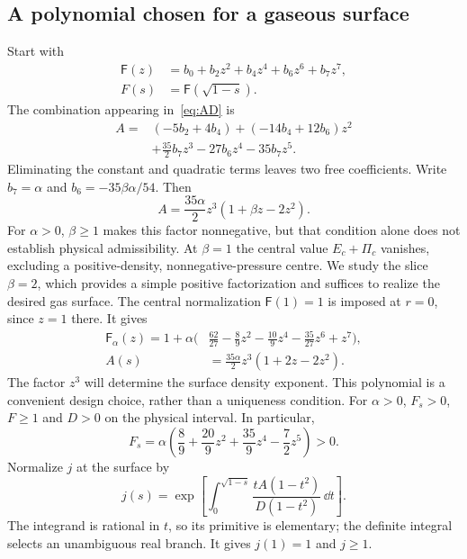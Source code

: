 \subsection{A polynomial chosen for a gaseous surface}
Start with
\begin{align}
 \mathsf F(z)&=b_0+b_2z^2+b_4z^4+b_6z^6+b_7z^7,\nonumber\\
 F(s)&=\mathsf F(\sqrt{1-s}).
\end{align}
The combination appearing in~\eqref{eq:AD} is
\begin{align}
 A={}&(-5b_2+4b_4)+(-14b_4+12b_6)z^2\nonumber\\
 &+\frac{35}{2}b_7z^3-27b_6z^4-35b_7z^5.
\end{align}
Eliminating the constant and quadratic terms leaves two free coefficients. Write $b_7=\alpha$ and $b_6=-35\beta\alpha/54$. Then
\begin{equation}
 A=\frac{35\alpha}{2}z^3(1+\beta z-2z^2).
\end{equation}
For $\alpha>0$, $\beta\ge1$ makes this factor nonnegative, but that condition alone does not establish physical admissibility. At $\beta=1$ the central value $E_c+\Pi_c$ vanishes, excluding a positive-density, nonnegative-pressure centre. We study the slice $\beta=2$, which provides a simple positive factorization and suffices to realize the desired gas surface. The central normalization $\mathsf F(1)=1$ is imposed at $r=0$, since $z=1$ there. It gives
\begin{align}
 \mathsf F_\alpha(z)=1+\alpha\biggl(&\frac{62}{27}-\frac89z^2-\frac{10}{9}z^4
                  -\frac{35}{27}z^6+z^7\biggr),\label{eq:F}\\
 A(s)&=\frac{35\alpha}{2}z^3(1+2z-2z^2).\label{eq:A}
\end{align}
The factor $z^3$ will determine the surface density exponent. This polynomial is a convenient design choice, rather than a uniqueness condition. For $\alpha>0$, $F_s>0$, $F\ge1$ and $D>0$ on the physical interval. In particular,
\begin{equation}
 F_s=\alpha\left(\frac89+\frac{20}{9}z^2+\frac{35}{9}z^4-\frac72z^5\right)>0.
\end{equation}
Normalize $j$ at the surface by
\begin{equation}
 j(s)=\exp\left[\int_0^{\sqrt{1-s}}
       \frac{tA(1-t^2)}{D(1-t^2)}\,\dd t\right].
 \label{eq:j}
\end{equation}
The integrand is rational in $t$, so its primitive is elementary; the definite integral selects an unambiguous real branch. It gives $j(1)=1$ and $j\ge1$.

